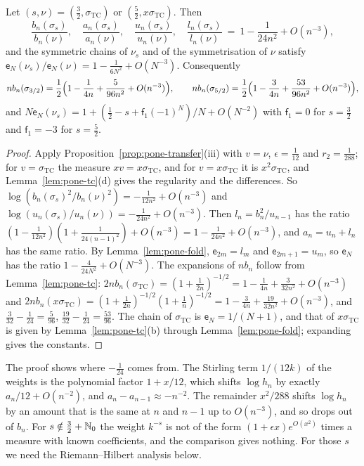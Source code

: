 \begin{corollary}[The cases $s=\frac32$ and $s=\frac52$]\label{cor:tc}
Let $(s,\nu)=(\frac32,\sigma_{\mathrm{TC}})$ or $(\frac52,x\sigma_{\mathrm{TC}})$. Then
\[
  \frac{b_n(\sigma_s)}{b_n(\nu)},\quad\frac{a_n(\sigma_s)}{a_n(\nu)},\quad\frac{u_n(\sigma_s)}{u_n(\nu)},\quad
  \frac{l_n(\sigma_s)}{l_n(\nu)}\ =\ 1-\frac1{24n^2}+O(n^{-3}),
\]
and the symmetric chains of $\nu_s$ and of the symmetrisation of $\nu$ satisfy
$\mathsf e_N(\nu_s)/\mathsf e_N(\nu)=1-\frac1{6N^2}+O(N^{-3})$. Consequently
\[
  nb_n(\sigma_{3/2})=\frac12\Bigl(1-\frac1{4n}+\frac5{96n^2}+O(n^{-3})\Bigr),\qquad
  nb_n(\sigma_{5/2})=\frac12\Bigl(1-\frac3{4n}+\frac{53}{96n^2}+O(n^{-3})\Bigr),
\]
and $N\mathsf e_N(\nu_s)=1+(\frac12-s+\mathsf f_1(-1)^N)/N+O(N^{-2})$ with $\mathsf f_1=0$ for $s=\frac32$ and
$\mathsf f_1=-3$ for $s=\frac52$.
\end{corollary}

\begin{proof}
Apply Proposition~\ref{prop:pone-transfer}(iii) with $v=\nu$, $\epsilon=\frac1{12}$ and $r_2=\frac1{288}$; for
$v=\sigma_{\mathrm{TC}}$ the measure $xv=x\sigma_{\mathrm{TC}}$, and for $v=x\sigma_{\mathrm{TC}}$ it is $x^2\sigma_{\mathrm{TC}}$, and
Lemma~\ref{lem:pone-tc}(d) gives the regularity and the differences. So
$\log(b_n(\sigma_s)^2/b_n(\nu)^2)=-\frac1{12n^2}+O(n^{-3})$ and $\log(u_n(\sigma_s)/u_n(\nu))=-\frac1{24n^2}+O(n^{-3})$.
Then $l_n=b_n^2/u_{n-1}$ has the ratio $(1-\frac1{12n^2})(1+\frac1{24(n-1)^2})+O(n^{-3})=1-\frac1{24n^2}+O(n^{-3})$, and
$a_n=u_n+l_n$ has the same ratio. By Lemma~\ref{lem:pone-fold}, $\mathsf e_{2m}=l_m$ and $\mathsf e_{2m+1}=u_m$, so
$\mathsf e_N$ has the ratio $1-\frac4{24N^2}+O(N^{-3})$. The expansions of $nb_n$ follow from Lemma~\ref{lem:pone-tc}:
$2nb_n(\sigma_{\mathrm{TC}})=(1+\frac1{2n})^{-1/2}=1-\frac1{4n}+\frac3{32n^2}+O(n^{-3})$ and
$2nb_n(x\sigma_{\mathrm{TC}})=(1+\frac1{2n})^{-1/2}(1+\frac1n)^{-1/2}=1-\frac3{4n}+\frac{19}{32n^2}+O(n^{-3})$, and
$\frac3{32}-\frac1{24}=\frac5{96}$, $\frac{19}{32}-\frac1{24}=\frac{53}{96}$. The chain of $\sigma_{\mathrm{TC}}$ is
$\mathsf e_N=1/(N+1)$, and that of $x\sigma_{\mathrm{TC}}$ is given by Lemma~\ref{lem:pone-tc}(b) through
Lemma~\ref{lem:pone-fold}; expanding gives the constants.
\end{proof}

The proof shows where $-\frac1{24}$ comes from. The Stirling term $1/(12k)$ of the weights is the polynomial
factor $1+x/12$, which shifts $\log h_n$ by exactly $a_n/12+O(n^{-2})$, and $a_n-a_{n-1}\approx-n^{-2}$. The remainder
$x^2/288$ shifts $\log h_n$ by an amount that is the same at $n$ and $n-1$ up to $O(n^{-3})$, and so drops out of $b_n$.
For $s\notin\frac32+\mathbb{N}_0$ the weight $k^{-s}$ is not of the form $(1+\epsilon x)e^{O(x^2)}$ times a measure with known
coefficients, and the comparison gives nothing. For those $s$ we need the Riemann--Hilbert analysis below.

